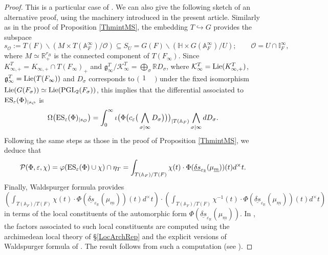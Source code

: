\documentclass{amsart}
\theoremstyle{definition}
\theoremstyle{remark}
\numberwithin{equation}{section}
\newcommand{\PGL}{{\mathrm{PGL}}}
\newcommand{\A}{{\mathbb A}}
\newcommand{\R}{{\mathbb R}}
\newcommand{\I}{{\mathbb I}}
\newcommand{\cK}{{\mathcal K}}
\newcommand{\cP}{{\mathcal P}}
\newcommand{\cO}{{\mathcal O}}
\begin{document}
\begin{proof}
This is a particular case of \cite[Theorem 1.2]{preprintsanti2}. We can also give the following sketch of an alternative proof, using the machinery introduced in the present article. Similarly as in the proof of Proposition \ref{ThmintMS}, the embedding $T\hookrightarrow G$ provides the subspace
\[
s_\cO:=T(F)\backslash (M\times T(\A_F^\infty)/\cO)\subseteq S_U=G(F)\backslash (\mathbb{H}\times G(\A_F^\infty)/U);\qquad \cO=U\cap\I_F^\infty,
\]
where $M\simeq \R_+^{r_B}$ is the connected component of $T(F_\infty)$. 
Since $K^T_{\infty,+}=K_{\infty,+}\cap T(F_\infty)_+$ and $\mathfrak{g}^T_\infty/\cK^T_\infty=\bigoplus_\sigma \R D_\sigma$, where $\cK^T_\infty={\rm Lie}(K^T_{\infty,+})$, $\mathfrak{g}^T_\infty={\rm Lie}(T(F_\infty))$ and $D_\sigma$ corresponds to $\big(\begin{smallmatrix}
    1&\\&
\end{smallmatrix}\big)$ under the fixed isomorphism ${\rm Lie}(G(F_\sigma))\simeq {\rm Lie}(\PGL_2(F_\sigma))$,
this implies that the differential associated to ${\rm ES}_\varepsilon(\Phi)_{\mid s_\cO}$ is
\[
\Omega\big({\rm ES}_\varepsilon(\Phi)_{\mid s_\cO}\big)=\int_0^\infty \iota\big(\Phi\big( c_\varepsilon\big(\bigwedge_{\sigma\mid\infty} D_\sigma\big)\big)\big)_{\mid T(\A_F)}\bigwedge_{\sigma\mid\infty} dD_\sigma.
\]
Following the same steps as those in the proof of Proposition \ref{ThmintMS}, we deduce that
\[
\cP(\Phi,\varepsilon,\chi)=\varphi({\rm ES}_\varepsilon(\Phi)\cup\chi)\cap \eta_{T}=\int_{T(\A_F)/T(F)}\chi(t)\cdot \Phi(\underline{\delta s}_{\varepsilon_\R}(\mu_{\underline{m}}))(t)d^\times t.
\]
Finally, Waldspurger formula provides {\small$\left(\int_{T(\A_F)/T(F)}\chi(t)\cdot \Phi(\underline{\delta s}_{\varepsilon_\R}(\mu_{\underline{m}}))(t)d^\times t\right)\cdot \left(\int_{T(\A_F)/T(F)}\chi^{-1}(t)\cdot \Phi(\underline{\delta s}_{\varepsilon_\R}(\mu_{\underline{m}}))(t)d^\times t\right)$} in terms of the local constituents of the automorphic form $\Phi(\underline{\delta s}_{\varepsilon_\R}(\mu_{\underline{m}}))$. In \cite{preprintsanti2}, the factors associated to such local constituents are computed using the archimedean local theory of \S \ref{LocArchRep} and the explicit versions of Waldspurger formula of \cite{CST}. The result follows from such a computation (see \cite[Theorem 1.2]{preprintsanti2}).
\end{proof}
\end{document}
